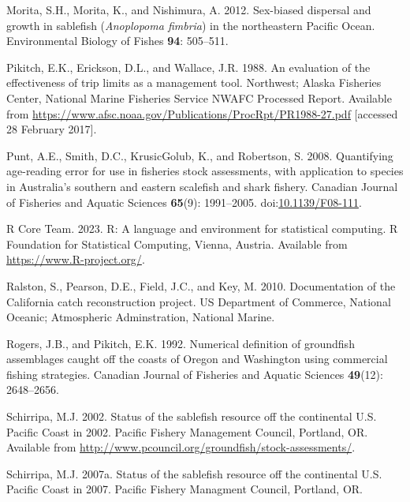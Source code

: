 \documentclass[
  english,
]{article}
\newlength{\cslhangindent}
\newenvironment{CSLReferences}[2] %
 {\begin{list}{}{%
  \setlength{\itemindent}{0pt}
  \setlength{\leftmargin}{0pt}
  \setlength{\parsep}{0pt}
  \ifodd #1
   \setlength{\leftmargin}{\cslhangindent}
   \setlength{\itemindent}{-1\cslhangindent}
  \fi
  \setlength{\itemsep}{#2\baselineskip}}}
 {\end{list}}
\begin{document}
\begin{CSLReferences}{1}{0}
Morita, S.H., Morita, K., and Nishimura, A. 2012. Sex-biased dispersal
and growth in sablefish (\emph{{A}noplopoma fimbria}) in the
northeastern {P}acific {O}cean. Environmental Biology of Fishes
\textbf{94}: 505--511.

Pikitch, E.K., Erickson, D.L., and Wallace, J.R. 1988. An evaluation of
the effectiveness of trip limits as a management tool. Northwest; Alaska
Fisheries Center, National Marine Fisheries Service NWAFC Processed
Report. Available from
\url{https://www.afsc.noaa.gov/Publications/ProcRpt/PR1988-27.pdf}
{[}accessed 28 February 2017{]}.

Punt, A.E., Smith, D.C., KrusicGolub, K., and Robertson, S. 2008.
Quantifying age-reading error for use in fisheries stock assessments,
with application to species in {A}ustralia's southern and eastern
scalefish and shark fishery. Canadian Journal of Fisheries and Aquatic
Sciences \textbf{65}(9): 1991--2005.
doi:\href{https://doi.org/10.1139/F08-111}{10.1139/F08-111}.

R Core Team. 2023. R: A language and environment for statistical
computing. R Foundation for Statistical Computing, Vienna, Austria.
Available from \url{https://www.R-project.org/}.

Ralston, S., Pearson, D.E., Field, J.C., and Key, M. 2010. Documentation
of the {California} catch reconstruction project. US Department of
Commerce, National Oceanic; Atmospheric Adminstration, National Marine.

Rogers, J.B., and Pikitch, E.K. 1992. Numerical definition of groundfish
assemblages caught off the coasts of {Oregon} and {Washington} using
commercial fishing strategies. Canadian Journal of Fisheries and Aquatic
Sciences \textbf{49}(12): 2648--2656.

Schirripa, M.J. 2002. Status of the {s}ablefish resource off the
continental {U}.{S}. {P}acific {C}oast in 2002. Pacific Fishery
Management Council, Portland, OR. Available from
\url{http://www.pcouncil.org/groundfish/stock-assessments/}.

Schirripa, M.J. 2007a. Status of the sablefish resource off the
continental {U}.{S}. {P}acific {C}oast in 2007. Pacific Fishery
Managment Council, Portland, OR.


\end{CSLReferences}
\end{document}
